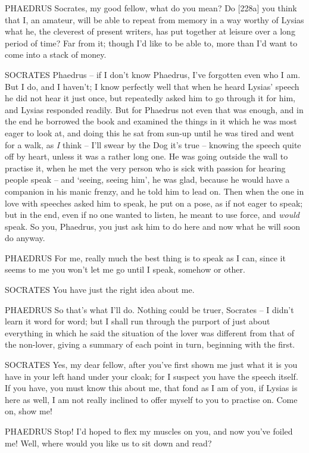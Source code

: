PHAEDRUS Socrates, my good fellow, what do you mean? Do {[}228a{]} you
think that I, an amateur, will be able to repeat from memory in a way
worthy of Lysias what he, the cleverest of present writers, has put
together at leisure over a long period of time? Far from it; though I'd
like to be able to, more than I'd want to come into a stack of money.

 SOCRATES Phaedrus -- if I don't know Phaedrus, I've forgotten
even who I am. But I do, and I haven't; I know perfectly well that when
he heard Lysias' speech he did not hear it just once, but repeatedly
asked him to go through it for him, and Lysias  responded
readily. But for Phaedrus not even that was enough, and in the end he
borrowed the book and examined the things in it which he was most eager
to look at, and doing this he sat from sun-up until he was tired and
went for a walk, as {\em I} think  -- I'll swear by the
Dog it's true -- knowing
the speech quite off by heart, unless it was a rather long one. He was
going outside the wall to practise it, when he met the very person who
is sick with passion for hearing people
speak -- and ‘seeing,
seeing him', he was glad,
because he would have a  companion in his manic frenzy, and he
told him to lead on. Then when the one in love with speeches asked him
to speak, he put on a pose, as if not eager to speak; but in the end,
even if no one wanted to listen, he meant to use force, and {\em would}
speak. So you, Phaedrus, you just ask him to do here and now 
what he will soon do anyway.

PHAEDRUS For me, really much the best thing is to speak as I can, since
it seems to me you won't let me go until I speak, somehow or other.

SOCRATES You have just the right idea about me.

PHAEDRUS So that's what I'll do. Nothing could be truer, 
Socrates -- I didn't learn it word for word; but I shall run through the
purport of just about everything in which he said the situation of the
lover was different from that of the non-lover, giving a summary of each
point in turn, beginning with  the first.

SOCRATES Yes, my dear fellow, after you've first shown me just what it
is you have in your left hand under your cloak; for I suspect you have
the speech itself. If you have, you must know this about me, that fond
as I am of you, if Lysias is here as well,  I am not really
inclined to offer myself to you to practise on. Come on, show me!

PHAEDRUS Stop! I'd hoped to flex my muscles on you, and now you've
foiled me! Well, where
would you like us to sit  down and read?

